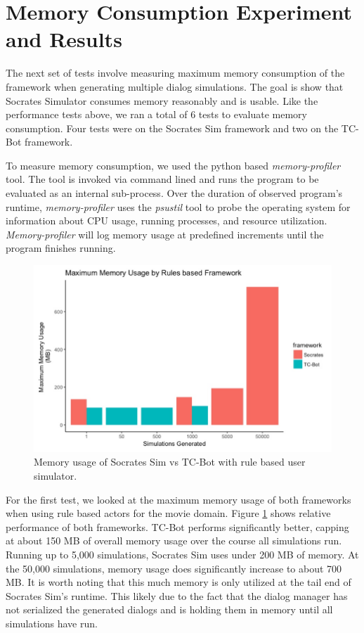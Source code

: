 \section{Memory Consumption Experiment and Results}

The next set of tests involve measuring maximum memory consumption of the framework when generating multiple dialog simulations. The goal is show that Socrates Simulator consumes memory reasonably and is usable. Like the performance tests above, we ran a total of 6 tests to evaluate memory consumption. Four tests were on the Socrates Sim framework and two on the TC-Bot framework.

To measure memory consumption, we used the python based \textit{memory-profiler} tool. The tool is invoked via command lined and runs the program to be evaluated as an internal sub-process. Over the duration of observed program's runtime, \textit{memory-profiler} uses the \textit{psustil} tool to probe the operating system for information about CPU usage, running processes, and resource utilization. \textit{Memory-profiler} will log memory usage at predefined increments until the program finishes running. 

\begin{figure}[h!]
	\label{fig:mem_usage_rules}
	\includegraphics[width=\linewidth]{diagrams/mem_usage_rules.jpeg}
	\caption{ Memory usage of Socrates Sim vs TC-Bot with rule based user simulator.}
\end{figure}

For the first test, we looked at the maximum memory usage of both frameworks when using rule based actors for the movie domain. Figure \ref{fig:mem_usage_rules} shows relative performance of both frameworks. TC-Bot performs significantly better, capping at about 150 MB of overall memory usage over the course all simulations run. Running up to 5,000 simulations, Socrates Sim uses under 200 MB of memory. At the 50,000 simulations, memory usage does significantly increase to about 700 MB. It is worth noting that this much memory is only utilized at the tail end of Socrates Sim's runtime. This likely due to the fact that the dialog manager has not serialized the generated dialogs and is holding them in memory until all simulations have run.  

